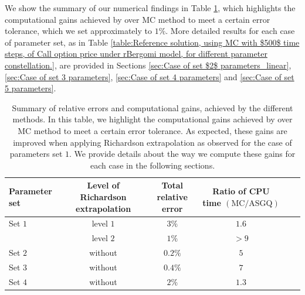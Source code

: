 We show  the summary of our numerical findings in Table \ref{table:Summary of our numerical results.}, which  highlights the computational gains achieved by  over MC method to meet a certain error tolerance, which we set approximately to $1\%$. More detailed results for each case of parameter set, as in Table \ref{table:Reference solution, using MC with $500$ time steps, of Call option price under rBergomi model, for different parameter constellation.},  are provided in  Sections \ref{sec:Case of set $2$ parameters_linear}, \ref{sec:Case of set 3 parameters}, \ref{sec:Case of set 4 parameters} and \ref{sec:Case of set 5 parameters}. 
\FloatBarrier
\begin{table}[!h]
	\centering
	\begin{small}
	\begin{tabular}{l*{4}{c}r}
	\toprule[1.5pt]
		Parameter set           & Level of Richardson extrapolation    &  Total relative error  & Ratio of CPU time  $\left(\text{MC}/ \text{ASGQ} \right)$ \\
		\hline
			Set $1$ & level $1$ &  $3\%$&  $1.6$ \\	
              & level $2$ &  $1\%$ &  $>9$ \\	
              \hline
            Set $2$  & without    &  $0.2\%$&  $5$ \\		
				 \hline
					Set $3$  & without    &  $0.4\%$&  $7$ \\	
					\hline
						Set $4$ & without  &  $2\%$&  $1.3$ \\	
		\bottomrule[1.25pt]
	\end{tabular}
\end{small}
	\caption{Summary of relative errors and computational gains, achieved by the different methods. In this table, we highlight the computational gains achieved by  over MC method to meet a certain error tolerance. As expected, these gains are improved when applying Richardson extrapolation as observed for the case of parameters set $1$. We provide details about the way we compute these gains for each case in the following sections.}
	\label{table:Summary of our numerical results.}
\end{table}
\FloatBarrier

	
	



